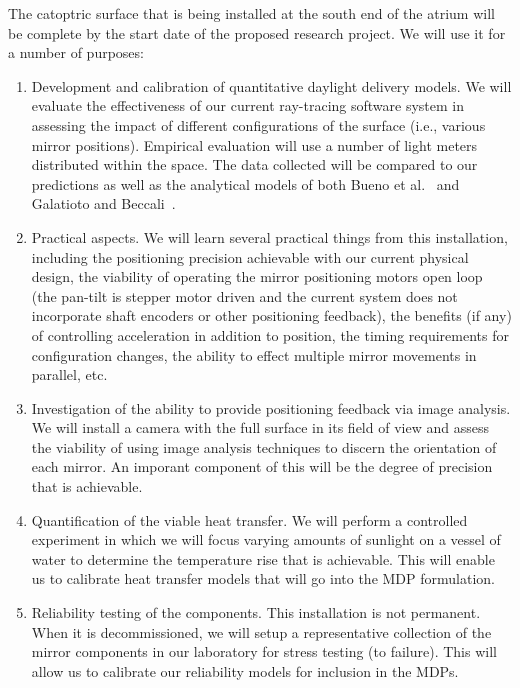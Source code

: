 The catoptric surface that is being installed at the south end of the
atrium will be complete by the start date of the proposed research project.
We will use it for a number of purposes:
\begin{enumerate}

\item Development and calibration of quantitative daylight delivery models.
We will evaluate the effectiveness of our current ray-tracing software
system in assessing the impact of different configurations of the surface
(i.e., various mirror positions).  Empirical evaluation will use a number
of light meters distributed within the space. The data collected will be
compared to our predictions as well as the analytical models
of both Bueno et al.~\cite{bwkk15} and Galatioto and Beccali~\cite{gb16}.

\item Practical aspects.
We will learn several practical things from this installation, including
the positioning precision achievable with our current physical design, the
viability of operating the mirror positioning motors open loop (the pan-tilt
is stepper motor driven and the current system does not incorporate
shaft encoders or other positioning feedback), the benefits (if any)
of controlling acceleration in addition to position, the timing
requirements for configuration changes, the ability to effect
multiple mirror movements in parallel, etc.

\item Investigation of the ability to provide positioning feedback via
image analysis.  We will install a camera with the full surface in its
field of view and assess the viability of using image analysis techniques
to discern the orientation of each mirror.  An imporant component of this
will be the degree of precision that is achievable.

\item Quantification of the viable heat transfer.
We will perform a controlled experiment in which we will focus varying
amounts of sunlight on a vessel of water to determine the temperature
rise that is achievable.  This will enable us to calibrate heat transfer
models that will go into the MDP formulation.

\item Reliability testing of the components.
This installation is not permanent. When it is decommissioned, we will
setup a representative collection of the mirror components in our laboratory
for stress testing (to failure).  This will allow us to calibrate our
reliability models for inclusion in the MDPs.

\end{enumerate}

